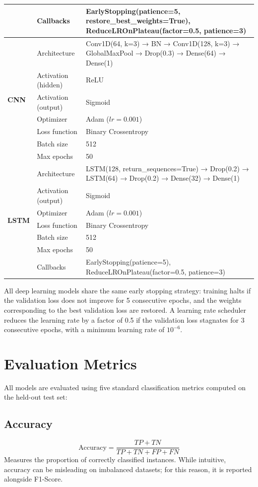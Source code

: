 \begin{table}[H]
{\begin{tabular}{|l|l|l|}
& Callbacks & EarlyStopping(patience=5, restore\_best\_weights=True),
                         ReduceLROnPlateau(factor=0.5, patience=3) \\
\hline
\multirow{7}{*}{\textbf{CNN}} &
    Architecture & Conv1D(64, k=3) → BN → Conv1D(128, k=3) → GlobalMaxPool → Drop(0.3) → Dense(64) → Dense(1) \\
& Activation (hidden) & ReLU \\
& Activation (output) & Sigmoid \\
& Optimizer & Adam ($lr = 0.001$) \\
& Loss function & Binary Crossentropy \\
& Batch size & 512 \\
& Max epochs & 50 \\
\hline
\multirow{7}{*}{\textbf{LSTM}} &
    Architecture & LSTM(128, return\_sequences=True) → Drop(0.2) → LSTM(64) → Drop(0.2) → Dense(32) → Dense(1) \\
& Activation (output) & Sigmoid \\
& Optimizer & Adam ($lr = 0.001$) \\
& Loss function & Binary Crossentropy \\
& Batch size & 512 \\
& Max epochs & 50 \\
& Callbacks & EarlyStopping(patience=5), ReduceLROnPlateau(factor=0.5, patience=3) \\
\hline
\end{tabular}
}
\end{table}

All deep learning models share the same early stopping strategy: training halts if the validation loss does not improve for 5 consecutive epochs, and the weights corresponding to the best validation loss are restored. A learning rate scheduler reduces the learning rate by a factor of 0.5 if the validation loss stagnates for 3 consecutive epochs, with a minimum learning rate of $10^{-6}$.

\section{Evaluation Metrics}

All models are evaluated using five standard classification metrics computed on the held-out test set:

\subsection{Accuracy}
\begin{equation}
    \text{Accuracy} = \frac{TP + TN}{TP + TN + FP + FN}
\end{equation}
Measures the proportion of correctly classified instances. While intuitive, accuracy can be misleading on imbalanced datasets; for this reason, it is reported alongside F1-Score.

